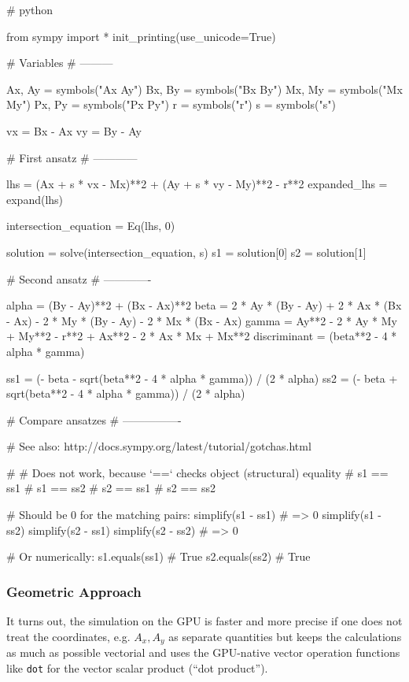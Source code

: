 \begin{python}
# python

from sympy import *
init_printing(use_unicode=True)

# Variables
# ---------

Ax, Ay = symbols("Ax Ay")
Bx, By = symbols("Bx By")
Mx, My = symbols("Mx My")
Px, Py = symbols("Px Py")
r = symbols("r")
s = symbols("s")

vx = Bx - Ax
vy = By - Ay

# First ansatz
# ------------

lhs = (Ax + s * vx - Mx)**2 + (Ay + s * vy - My)**2 - r**2
expanded_lhs = expand(lhs)

intersection_equation = Eq(lhs, 0)

solution = solve(intersection_equation, s)
s1 = solution[0]
s2 = solution[1]

# Second ansatz
# -------------

alpha = (By - Ay)**2 + (Bx - Ax)**2
beta = 2 * Ay * (By - Ay) + 2 * Ax * (Bx - Ax) - 2 * My * (By - Ay) - 2 * Mx * (Bx - Ax)
gamma = Ay**2 - 2 * Ay * My + My**2 - r**2 + Ax**2 - 2 * Ax * Mx + Mx**2
discriminant = (beta**2 - 4 * alpha * gamma)

ss1 = (- beta - sqrt(beta**2 - 4 * alpha * gamma)) / (2 * alpha)
ss2 = (- beta + sqrt(beta**2 - 4 * alpha * gamma)) / (2 * alpha)

# Compare ansatzes
# ----------------

# See also: http://docs.sympy.org/latest/tutorial/gotchas.html

# # Does not work, because `==` checks object (structural) equality
# s1 == ss1
# s1 == ss2
# s2 == ss1
# s2 == ss2

# Should be 0 for the matching pairs:
simplify(s1 - ss1)  # => 0
simplify(s1 - ss2)
simplify(s2 - ss1)
simplify(s2 - ss2)  # => 0

# Or numerically:
s1.equals(ss1)  # True
s2.equals(ss2)  # True
\end{python}

\subsubsection{Geometric Approach}\label{geometric-approach}

It turns out, the simulation on the GPU is faster and more precise if
one does not treat the coordinates, e.g. \(A_x, A_y\) as separate
quantities but keeps the calculations as much as possible vectorial and
uses the GPU-native vector operation functions like \texttt{dot} for the
vector scalar product (``dot product'').

